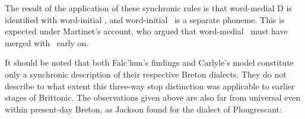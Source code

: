 The result of the application of these synchronic rules is that word-medial \gls{D} is identified with word-initial \lT, and word-initial \xD\ is a separate phoneme. This is expected under Martinet's account, who argued that word-medial \xD\ must have merged with \lT\ early on.

It should be noted that both Falc'hun's findings and Carlyle's model constitute only a synchronic description of their respective Breton dialects. They do not describe to what extent this three-way stop distinction was applicable to earlier stages of Brittonic. The observations given above are also far from universal even within present-day Breton, as Jackson found for the dialect of Plougrescant:



